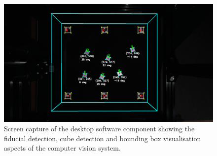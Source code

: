 \begin{figure}[H]
	\centering
	\includegraphics[width=1\linewidth]{figures/202110/computer-vision-overview.png}
	\caption{Screen capture of the desktop software component showing the fiducial detection, cube detection and bounding box visualisation aspects of the computer vision system.}
	\label{fig:computer-vision-overview}
\end{figure}

\pendsign